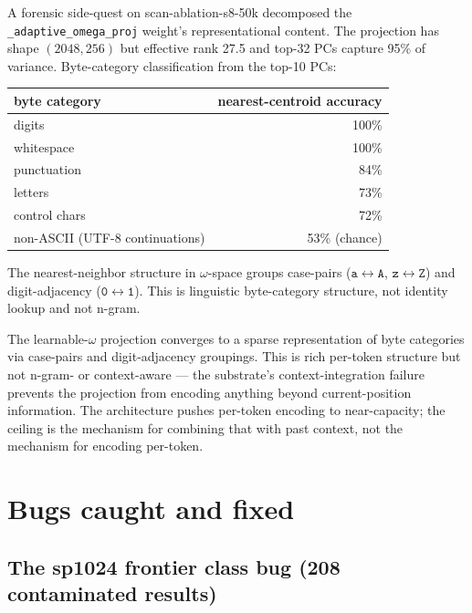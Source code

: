 A forensic side-quest on scan-ablation-s8-50k decomposed the \texttt{\_adaptive\_omega\_proj} weight's representational content. The projection has shape $(2048, 256)$ but effective rank 27.5 and top-32 PCs capture 95\% of variance. Byte-category classification from the top-10 PCs:

\begin{center}
\begin{tabular}{lr}
\toprule
byte category & nearest-centroid accuracy \\
\midrule
digits         & 100\% \\
whitespace     & 100\% \\
punctuation    & 84\% \\
letters        & 73\% \\
control chars  & 72\% \\
non-ASCII (UTF-8 continuations) & 53\% (chance) \\
\bottomrule
\end{tabular}
\end{center}

The nearest-neighbor structure in $\omega$-space groups case-pairs ($\mathtt{a}\leftrightarrow\mathtt{A}$, $\mathtt{z}\leftrightarrow\mathtt{Z}$) and digit-adjacency ($\mathtt{0}\leftrightarrow\mathtt{1}$). This is linguistic byte-category structure, not identity lookup and not n-gram.

\begin{result}
The learnable-$\omega$ projection converges to a sparse representation of byte categories via case-pairs and digit-adjacency groupings. This is rich per-token structure but not n-gram- or context-aware --- the substrate's context-integration failure prevents the projection from encoding anything beyond current-position information. The architecture pushes per-token encoding to near-capacity; the ceiling is the mechanism for combining that with past context, not the mechanism for encoding per-token.
\end{result}

\section{Bugs caught and fixed}

\subsection{The sp1024 frontier class bug (208 contaminated results)}

